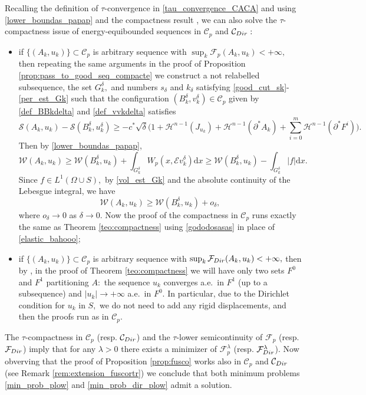 \documentclass[reqno]{amsart}
\numberwithin{equation}{section}
\theoremstyle{plain}
\theoremstyle{definition}
\newcommand{\cH}{\mathcal{H}}
\newcommand{\cS}{\mathcal{S}}
\newcommand{\cF}{\mathcal{F}}
\newcommand{\cW}{\mathcal{W}}
\newcommand{\p}{\partial}
\renewcommand{\d}{\mathrm{d}}
\newcommand{\str}[1]{\mathcal{E}#1}
\newcommand{\admissible}{\mathcal{C}}
\begin{document}
Recalling the definition of $\tau$-convergence in \eqref{tau_convergence_CACA} and using \eqref{lower_boundas_papap} and the compactness result \cite[Theorem 1.1]{ChC:2020_jems}, we can also solve the  $\tau$-compactness issue of energy-equibounded sequences in $\admissible_p$ and $\admissible_{\rm Dir}:$
\begin{itemize}[left=0pt]
 \item[--] if $\{(A_k,u_k)\}\subset \admissible_p$ is arbitrary sequence with $\sup_k \cF_p(A_k,u_k) <+\infty,$ then repeating the same arguments in the proof of Proposition  \ref{prop:pass_to_good_seq_compacte} we construct a not relabelled subsequence, the set $G_k^\delta,$ and numbers $s_\delta$ and $k_\delta$ satisfying \eqref{good_cut_sk}-\eqref{per_est_Gk} such that the configuration $(B_k^\delta,v_k^\delta)\in\admissible_p$ given by \eqref{def_BBkdelta} and \eqref{def_vvkdelta} satisfies
 $$
 \cS(A_k,u_k) - \cS(B_k^\delta,u_k^\delta) \ge 
-c^* \sqrt\delta \Big(1 + \cH^{n-1}(J_{u_k}) + \cH^{n-1}(\p^*A_k) + \sum\limits_{i=0}^m\cH^{n-1}(\p^*F^i) \Big).
 $$
 Then by \eqref{lower_boundas_papap},
 $$
 \cW(A_k,u_k) \ge \cW(B_k^\delta,u_k) + \int_{G_k^\delta}W_p(x,\str{v_k^\delta})\d x \ge 
 \cW(B_k^\delta,u_k) - \int_{G_k^\delta}|f|\d x.
 $$
 Since $f\in L^1(\Omega\cup S),$ by \eqref{vol_est_Gk} and the absolute continuity of the Lebesgue integral, we have
 \begin{equation}\label{gododosasas}
  \cW(A_k,u_k) \ge \cW(B_k^\delta,u_k) + o_\delta,  
 \end{equation}
%
 where $o_\delta\to0$ as $\delta\to0.$ Now the proof of the compactness in $\admissible_p$ runs exactly the same as Theorem \ref{teo:compactness} using \eqref{gododosasas} in place of  \eqref{elastic_bahooo};
 
 \item[--] if $\{(A_k,u_k)\}\subset \admissible_p$ is arbitrary sequence with $\sup_k \cF_{\rm Dir}(A_k,u_k) <+\infty,$ then  
 by \cite[Theorem 1.1]{ChC:2020_jems}, in the proof of Theorem \ref{teo:compactness} we will have only two sets $F^0$ and $F^1$ partitioning $A:$ the sequence $u_k$ converges a.e.\  in $F^1$  (up to a subsequence) and $|u_k|\to+\infty$ a.e.\  in $F^0.$ In particular, due to the Dirichlet condition for $u_k$ in $S,$ we do not need to add any rigid displacements, and then the proofs run as in $\admissible_p$.
\end{itemize}

The $\tau$-compactness in $\admissible_p$ (resp. $\admissible_{\rm Dir}$) and the $\tau$-lower semicontinuity of $\cF_p$  (resp. $\cF_{\rm Dir}$) imply that for any $\lambda>0$ there exists a minimizer of $\cF_p^\lambda$  (resp. $\cF_{\rm Dir}^\lambda$). Now obverving that the proof of Proposition \ref{prop:fusco} works also in $\admissible_p$ and $\admissible_{\rm Dir}$ (see Remark \ref{rem:extension_fuscortr}) we conclude that both minimum problems \eqref{min_prob_plow} and \eqref{min_prob_dir_plow}  admit  a solution. 
\end{document}
